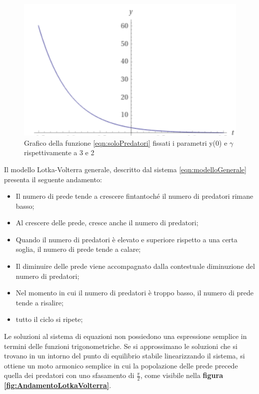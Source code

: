 \documentclass[11pt]{article}
\begin{document}
\begin{figure}[h]
    \centering
    \includegraphics[scale = 1]{plotSoloPredatori.PNG}
    \caption{Grafico della funzione \eqref{eqn:soloPredatori} fissati i parametri y(0) e $\gamma$ rispettivamente a 3 e 2}
    \label{figPlotLotkaVolterraSoloPredatori}
\end{figure}

Il modello Lotka-Volterra generale, descritto dal sistema \ref{eqn:modelloGenerale} presenta il seguente andamento: 
\begin{itemize}
    \item Il numero di prede tende a crescere fintantoché il numero di predatori rimane basso;
    \item Al crescere delle prede, cresce anche il numero di predatori;
    \item Quando il numero di predatori è elevato e superiore rispetto a una certa soglia, il numero di prede tende a calare;
    \item Il diminuire delle prede viene accompagnato dalla contestuale diminuzione del numero di predatori;
    \item Nel momento in cui il numero di predatori è troppo basso, il numero di prede tende a risalire;
    \item tutto il ciclo si ripete;
\end{itemize}

Le soluzioni al sistema di equazioni non possiedono una espressione semplice in termini delle funzioni trigonometriche. Se si approssimano le soluzioni che si trovano in un intorno del punto di equilibrio stabile linearizzando il sistema, si ottiene un moto armonico semplice in cui la popolazione delle prede precede quella dei predatori con uno sfasamento di $\frac{\pi}{2}$, come visibile nella \textbf{figura \ref{fig:AndamentoLotkaVolterra}}\cite{WikiLotkaVolterra}.
\end{document}
